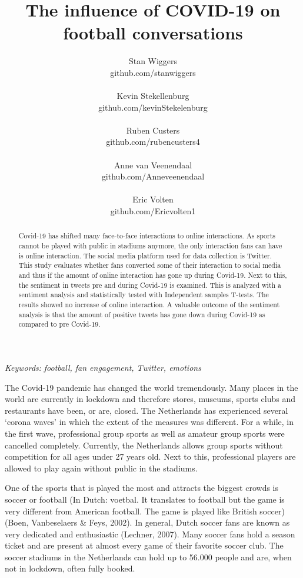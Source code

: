 \documentclass[12pt]{article}
\date{}
\title{The influence of COVID-19 on football conversations}
\author{Stan Wiggers \\ github.com/stanwiggers
\\ \\ Kevin Stekellenburg \\ github.com/kevinStekelenburg
\\ \\ Ruben Custers \\ github.com/rubencusters4
\\ \\ Anne van Veenendaal \\ github.com/Anneveenendaal
\\ \\ Eric Volten \\ github.com/Ericvolten1}
\providecommand{\keywords}[1]
{
   \small
  \textit{\hspace{-1em} Keywords: } #1
}
\begin{document}
\maketitle
\thispagestyle{fancy}
\begin{abstract}
  \noindent  Covid-19 has shifted many face-to-face interactions to online interactions. As sports cannot be played with public in stadiums anymore, the only interaction fans can have is online interaction. The social media platform used for data collection is Twitter. This study evaluates whether fans converted some of their interaction to social media and thus if the amount of online interaction has gone up during Covid-19.  Next to this, the sentiment in tweets pre and during Covid-19 is examined. This is analyzed with a sentiment analysis and statistically tested with Independent samples T-tests. The results showed no increase of online interaction. A valuable outcome of the sentiment analysis is that the amount of positive tweets has gone down during Covid-19 as compared to pre Covid-19. 
\end{abstract}

\keywords{\textit{football, fan engagement, Twitter, emotions} \vspace{8ex}}

\noindent The Covid-19 pandemic has changed the world tremendously. Many places in the world are currently in lockdown and therefore stores, museums, sports clubs and restaurants have been, or are, closed. The Netherlands has experienced several ‘corona waves’ in which the extent of the measures was different. For a while, in the first wave, professional group sports as well as amateur group sports were cancelled completely. Currently, the Netherlands allows group sports without competition for all ages under 27 years old. Next to this, professional players are allowed to play again without public in the stadiums.

One of the sports that is played the most and attracts the biggest crowds is soccer or football (In Dutch: voetbal. It translates to football but the game is very different from American football. The game is played like British soccer) (Boen, Vanbeselaers \& Feys, 2002). In general, Dutch soccer fans are known as very dedicated and enthusiastic (Lechner, 2007). Many soccer fans hold a season ticket and are present at almost every game of their favorite soccer club. The soccer stadiums in the Netherlands can hold up to 56.000 people and are, when not in lockdown, often fully booked.
\end{document}
